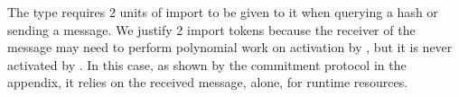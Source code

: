 The type requires 2 units of import to be given to it when querying a hash or sending a message.
We justify 2 import tokens because the receiver of the message may need to perform polynomial work on activation by \Fropp, but it is never activated by \Z.
In this case, as shown by the commitment protocol in the appendix, it relies on the received message, alone, for runtime resources.

